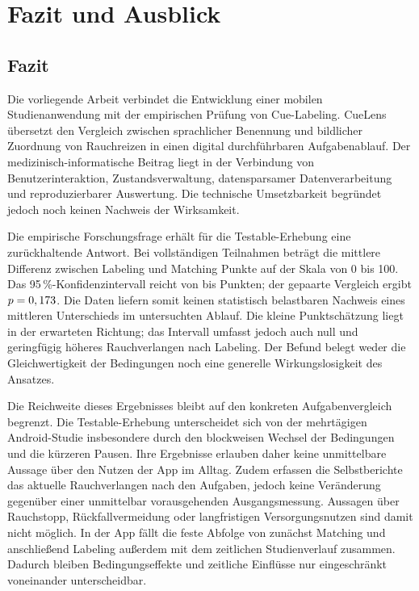 
\chapter{Fazit und Ausblick}
\begingroup
\raggedbottom
\setlength{\emergencystretch}{1em}

\section{Fazit}

Die vorliegende Arbeit verbindet die Entwicklung einer mobilen Studienanwendung mit der empirischen Prüfung von Cue-Labeling. CueLens übersetzt den Vergleich zwischen sprachlicher Benennung und bildlicher Zuordnung von Rauchreizen in einen digital durchführbaren Aufgabenablauf. Der medizinisch-informatische Beitrag liegt in der Verbindung von Benutzerinteraktion, Zustandsverwaltung, datensparsamer Datenverarbeitung und reproduzierbarer Auswertung. Die technische Umsetzbarkeit begründet jedoch noch keinen Nachweis der Wirksamkeit.

Die empirische Forschungsfrage erhält für die Testable-Erhebung eine zurückhaltende Antwort. Bei \TestableN{} vollständigen Teilnahmen beträgt die mittlere Differenz zwischen Labeling und Matching \TestableDiff{} Punkte auf der Skala von 0 bis 100. Das 95\,\%-Konfidenzintervall reicht von \TestableLower{} bis \TestableUpper{} Punkten; der gepaarte Vergleich ergibt $p=0,173$. Die Daten liefern somit keinen statistisch belastbaren Nachweis eines mittleren Unterschieds im untersuchten Ablauf. Die kleine Punktschätzung liegt in der erwarteten Richtung; das Intervall umfasst jedoch auch null und geringfügig höheres Rauchverlangen nach Labeling. Der Befund belegt weder die Gleichwertigkeit der Bedingungen noch eine generelle Wirkungslosigkeit des Ansatzes.

Die Reichweite dieses Ergebnisses bleibt auf den konkreten Aufgabenvergleich begrenzt. Die Testable-Erhebung unterscheidet sich von der mehrtägigen Android-Studie insbesondere durch den blockweisen Wechsel der Bedingungen und die kürzeren Pausen. Ihre Ergebnisse erlauben daher keine unmittelbare Aussage über den Nutzen der App im Alltag. Zudem erfassen die Selbstberichte das aktuelle Rauchverlangen nach den Aufgaben, jedoch keine Veränderung gegenüber einer unmittelbar vorausgehenden Ausgangsmessung. Aussagen über Rauchstopp, Rückfallvermeidung oder langfristigen Versorgungsnutzen sind damit nicht möglich. In der App fällt die feste Abfolge von zunächst Matching und anschließend Labeling außerdem mit dem zeitlichen Studienverlauf zusammen. Dadurch bleiben Bedingungseffekte und zeitliche Einflüsse nur eingeschränkt voneinander unterscheidbar.

